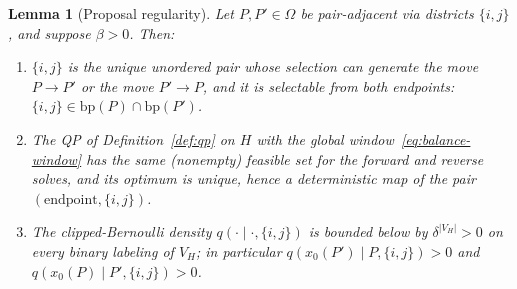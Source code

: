 \documentclass[11pt]{article}
\newtheorem{lemma}{Lemma}[section]
\begin{document}
\begin{lemma}[Proposal regularity]\label{lem:qpmh-regular}
Let $P, P' \in \Omega$ be pair-adjacent via districts $\{i,j\}$, and
suppose $\beta > 0$. Then:
\begin{enumerate}
  \item[(i)] $\{i,j\}$ is the unique unordered pair whose selection
    can generate the move $P \to P'$ or the move $P' \to P$, and it
    is selectable from both endpoints:
    $\{i,j\} \in \mathrm{bp}(P) \cap \mathrm{bp}(P')$.
  \item[(ii)] The QP of Definition~\ref{def:qp} on $H$ with the
    global window~\eqref{eq:balance-window} has the same (nonempty)
    feasible set for the forward and reverse solves, and its optimum
    is unique, hence a deterministic map of the pair
    $(\text{endpoint}, \{i,j\})$.
  \item[(iii)] The clipped-Bernoulli density
    $q(\cdot \mid \cdot, \{i,j\})$ is bounded below by
    $\delta^{|V_H|} > 0$ on every binary labeling of $V_H$; in
    particular $q(x_0(P') \mid P, \{i,j\}) > 0$ and
    $q(x_0(P) \mid P', \{i,j\}) > 0$.
\end{enumerate}
\end{lemma}
\end{document}
